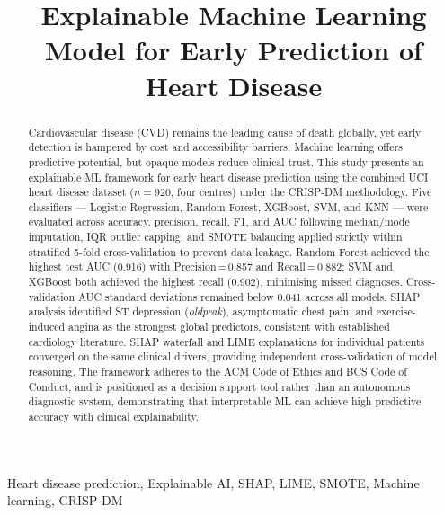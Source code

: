 \documentclass[conference]{IEEEtran}
\begin{document}
\title{Explainable Machine Learning Model for Early Prediction of Heart Disease}

\author{
}

\maketitle

\begin{abstract}
Cardiovascular disease (CVD) remains the leading cause of death globally, yet early detection is hampered by cost and accessibility barriers. Machine learning offers predictive potential, but opaque models reduce clinical trust. This study presents an explainable ML framework for early heart disease prediction using the combined UCI heart disease dataset ($n{=}920$, four centres) under the CRISP-DM methodology. Five classifiers — Logistic Regression, Random Forest, XGBoost, SVM, and KNN — were evaluated across accuracy, precision, recall, F1, and AUC following median/mode imputation, IQR outlier capping, and SMOTE balancing applied strictly within stratified 5-fold cross-validation to prevent data leakage. Random Forest achieved the highest test AUC (0.916) with Precision\,=\,0.857 and Recall\,=\,0.882; SVM and XGBoost both achieved the highest recall (0.902), minimising missed diagnoses. Cross-validation AUC standard deviations remained below 0.041 across all models. SHAP analysis identified ST depression (\textit{oldpeak}), asymptomatic chest pain, and exercise-induced angina as the strongest global predictors, consistent with established cardiology literature. SHAP waterfall and LIME explanations for individual patients converged on the same clinical drivers, providing independent cross-validation of model reasoning. The framework adheres to the ACM Code of Ethics and BCS Code of Conduct, and is positioned as a decision support tool rather than an autonomous diagnostic system, demonstrating that interpretable ML can achieve high predictive accuracy with clinical explainability.
\end{abstract}

\begin{IEEEkeywords}
Heart disease prediction, Explainable AI, SHAP, LIME, SMOTE, Machine learning, CRISP-DM
\end{IEEEkeywords}
\end{document}
